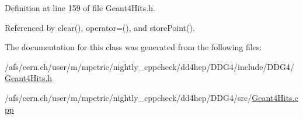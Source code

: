 Definition at line 159 of file Geant4\+Hits.\+h.



Referenced by clear(), operator=(), and store\+Point().



The documentation for this class was generated from the following files\+:\begin{DoxyCompactItemize}
\item 
/afs/cern.\+ch/user/m/mpetric/nightly\+\_\+cppcheck/dd4hep/\+D\+D\+G4/include/\+D\+D\+G4/\hyperlink{_geant4_hits_8h}{Geant4\+Hits.\+h}\item 
/afs/cern.\+ch/user/m/mpetric/nightly\+\_\+cppcheck/dd4hep/\+D\+D\+G4/src/\hyperlink{_geant4_hits_8cpp}{Geant4\+Hits.\+cpp}\end{DoxyCompactItemize}
